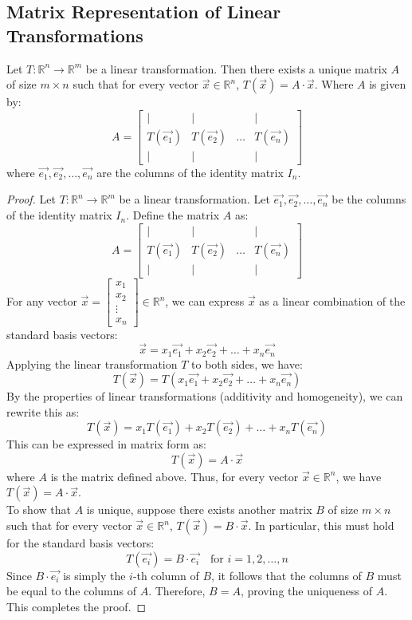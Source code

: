 \subsection{Matrix Representation of Linear Transformations}
\begin{theorem}
    Let $T: \mathbb{R}^n \to \mathbb{R}^m$ be a linear transformation. Then there exists a unique matrix $A$ of size $m \times n$ such that for every vector $\vec{x} \in \mathbb{R}^n$, $T(\vec{x}) = A \cdot \vec{x}$. Where $A$ is given by:
    \[
        A = \begin{bmatrix} | & | && | \\ T(\vec{e_1}) & T(\vec{e_2}) & \ldots & T(\vec{e_n}) \\ | & | && | \end{bmatrix}
    \]
    where $\vec{e_1}, \vec{e_2}, \ldots, \vec{e_n}$ are the columns of the identity matrix $I_n$.
\end{theorem}
\begin{proof}
    Let $T: \mathbb{R}^n \to \mathbb{R}^m$ be a linear transformation. Let $\vec{e_1}, \vec{e_2}, \ldots, \vec{e_n}$ be the columns of the identity matrix $I_n$. Define the matrix $A$ as:
    \[
        A = \begin{bmatrix} | & | && | \\ T(\vec{e_1}) & T(\vec{e_2}) & \ldots & T(\vec{e_n}) \\ | & | && | \end{bmatrix}
    \]
    For any vector $\vec{x} = \begin{bmatrix} x_1 \\ x_2 \\ \vdots \\ x_n \end{bmatrix} \in \mathbb{R}^n$, we can express $\vec{x}$ as a linear combination of the standard basis vectors:
    \[
        \vec{x} = x_1 \vec{e_1} + x_2 \vec{e_2} + \ldots + x_n \vec{e_n}
    \]
    Applying the linear transformation $T$ to both sides, we have:
    \[
        T(\vec{x}) = T(x_1 \vec{e_1} + x_2 \vec{e_2} + \ldots + x_n \vec{e_n})
    \]
    By the properties of linear transformations (additivity and homogeneity), we can rewrite this as:
    \[
        T(\vec{x}) = x_1 T(\vec{e_1}) + x_2 T(\vec{e_2}) + \ldots + x_n T(\vec{e_n})
    \]
    This can be expressed in matrix form as:
    \[
        T(\vec{x}) = A \cdot \vec{x}
    \]
    where $A$ is the matrix defined above. Thus, for every vector $\vec{x} \in \mathbb{R}^n$, we have $T(\vec{x}) = A \cdot \vec{x}$. \\
    To show that $A$ is unique, suppose there exists another matrix $B$ of size $m \times n$ such that for every vector $\vec{x} \in \mathbb{R}^n$, $T(\vec{x}) = B \cdot \vec{x}$. In particular, this must hold for the standard basis vectors:
    \[
        T(\vec{e_i}) = B \cdot \vec{e_i} \quad \text{for } i = 1, 2, \ldots, n
    \]
    Since $B \cdot \vec{e_i}$ is simply the $i$-th column of $B$, it follows that the columns of $B$ must be equal to the columns of $A$. Therefore, $B = A$, proving the uniqueness of $A$. This completes the proof.
\end{proof}

